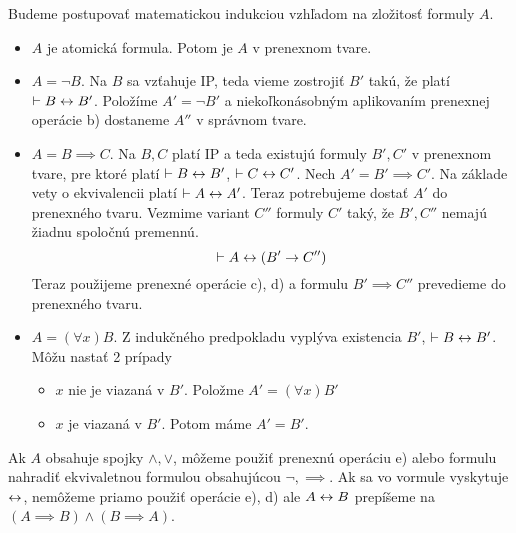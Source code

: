 \begin{dokaz}
Budeme postupovať matematickou indukciou vzhľadom na zložitosť formuly $A$.
\begin{itemize}
    \item $A$ je atomická formula. Potom je $A$ v prenexnom tvare.

    \item $A=\neg B$. Na $B$ sa vzťahuje IP, teda vieme zostrojiť
        $B'$ takú, že platí
        $\vdash B \leftrightarrow B'$.
        Položíme $A'=\neg B'$ a niekoľkonásobným aplikovaním 
        prenexnej operácie b) dostaneme 
        $A''$ v správnom tvare.

    \item $A=B \implies C$. Na $B,C$ platí IP a teda existujú formuly
        $B',C'$ v prenexnom tvare, pre ktoré platí
        $\vdash B \leftrightarrow B'$, $\vdash C \leftrightarrow C'$.
        Nech $A' = B' \implies C'$. Na základe vety o ekvivalencii platí
        $\vdash A \leftrightarrow A'$. Teraz potrebujeme dostať
        $A'$ do prenexného tvaru.
        Vezmime variant $C''$ formuly $C'$ taký, že $B',C''$ nemajú
        žiadnu spoločnú premennú.
        \begin{equation*}
            \vdash A \leftrightarrow (B' \rightarrow C'')
        \end{equation*}
        Teraz použijeme prenexné operácie c), d) a formulu
        $B' \implies C''$ prevedieme do prenexného tvaru.

    \item $A=(\forall x)B$. Z indukčného predpokladu vyplýva
        existencia $B'$, $\vdash B \leftrightarrow B'$.
        Môžu nastať 2 prípady
        \begin{itemize}
        \item $x$ nie je viazaná v $B'$. Položme $A' = (\forall x) B'$
        \item $x$ je viazaná v $B'$. Potom máme $A' = B'$.
        \end{itemize}
\end{itemize}
\end{dokaz}
\begin{poznamka}
    Ak $A$ obsahuje spojky 
    $\land,\lor$, môžeme použiť prenexnú operáciu e) alebo formulu nahradiť
    ekvivaletnou formulou obsahujúcou $\neg,\implies$.
    Ak sa vo vormule vyskytuje $\leftrightarrow$, nemôžeme priamo
    použiť operácie e), d) ale $A\leftrightarrow B$ prepíšeme na
    $(A\implies B) \land (B \implies A)$.
\end{poznamka}

